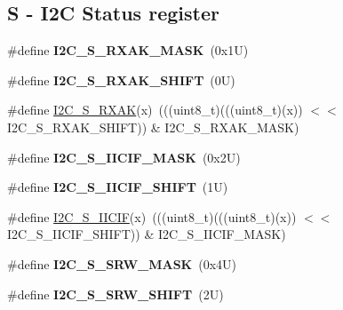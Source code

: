 \subsection*{S -\/ I2C Status register}
\begin{DoxyCompactItemize}
\item 
\mbox{\label{group___i2_c___register___masks_gad24c329c5eb1d51b4d1bdf637f0071d3}} 
\#define {\bfseries I2\+C\+\_\+\+S\+\_\+\+R\+X\+A\+K\+\_\+\+M\+A\+SK}~(0x1\+U)
\item 
\mbox{\label{group___i2_c___register___masks_ga120dc0ebf2986dd160b9592ec711a177}} 
\#define {\bfseries I2\+C\+\_\+\+S\+\_\+\+R\+X\+A\+K\+\_\+\+S\+H\+I\+FT}~(0\+U)
\item 
\#define \mbox{\hyperlink{group___i2_c___register___masks_ga8aacd2266555789c7840411ebcc2fb42}{I2\+C\+\_\+\+S\+\_\+\+R\+X\+AK}}(x)~(((uint8\+\_\+t)(((uint8\+\_\+t)(x)) $<$$<$ I2\+C\+\_\+\+S\+\_\+\+R\+X\+A\+K\+\_\+\+S\+H\+I\+FT)) \& I2\+C\+\_\+\+S\+\_\+\+R\+X\+A\+K\+\_\+\+M\+A\+SK)
\item 
\mbox{\label{group___i2_c___register___masks_ga23f38878179bb0186dd2c64698417ec3}} 
\#define {\bfseries I2\+C\+\_\+\+S\+\_\+\+I\+I\+C\+I\+F\+\_\+\+M\+A\+SK}~(0x2\+U)
\item 
\mbox{\label{group___i2_c___register___masks_ga36fe15d9bbf77410ab19317e78d2d5ea}} 
\#define {\bfseries I2\+C\+\_\+\+S\+\_\+\+I\+I\+C\+I\+F\+\_\+\+S\+H\+I\+FT}~(1\+U)
\item 
\#define \mbox{\hyperlink{group___i2_c___register___masks_ga1a977ca499ff9150e08cbd671628a2c2}{I2\+C\+\_\+\+S\+\_\+\+I\+I\+C\+IF}}(x)~(((uint8\+\_\+t)(((uint8\+\_\+t)(x)) $<$$<$ I2\+C\+\_\+\+S\+\_\+\+I\+I\+C\+I\+F\+\_\+\+S\+H\+I\+FT)) \& I2\+C\+\_\+\+S\+\_\+\+I\+I\+C\+I\+F\+\_\+\+M\+A\+SK)
\item 
\mbox{\label{group___i2_c___register___masks_gaf802822114be53d791101a05f50af5a3}} 
\#define {\bfseries I2\+C\+\_\+\+S\+\_\+\+S\+R\+W\+\_\+\+M\+A\+SK}~(0x4\+U)
\item 
\mbox{\label{group___i2_c___register___masks_gae9ff7b0c74aeb1c906bfe71fa1620fae}} 
\#define {\bfseries I2\+C\+\_\+\+S\+\_\+\+S\+R\+W\+\_\+\+S\+H\+I\+FT}~(2\+U)

\end{DoxyCompactItemize}
